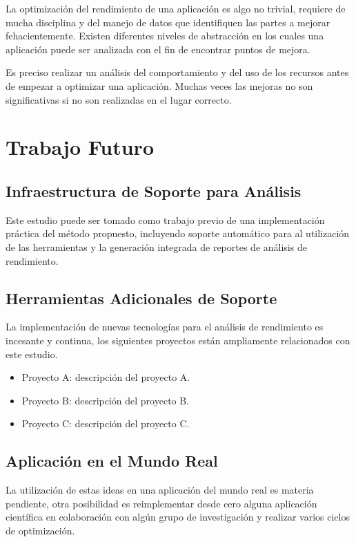 \documentclass[a4paper]{report}
\begin{document}
\bigskip

La optimización del rendimiento de una aplicación es algo no trivial, requiere de mucha
disciplina y del manejo de datos que identifiquen las partes a mejorar fehacientemente.
Existen diferentes niveles de abstracción en los cuales una aplicación puede ser analizada con el fin
de encontrar puntos de mejora. 

\bigskip

Es preciso realizar un análisis del comportamiento y del uso de los recursos antes de
empezar a optimizar una aplicación. Muchas veces las mejoras no son significativas si no
son realizadas en el lugar correcto.

\chapter{Trabajo Futuro}

\section{Infraestructura de Soporte para Análisis}

Este estudio puede ser tomado como trabajo previo de una implementación práctica del método propuesto,
incluyendo soporte automático para al utilización de las herramientas y la generación integrada de
reportes de análisis de rendimiento.

\section{Herramientas Adicionales de Soporte}

La implementación de nuevas tecnologías para el análisis de rendimiento
es incesante y continua, los siguientes proyectos están ampliamente
relacionados con este estudio.

\begin{itemize}
\item Proyecto A: descripción del proyecto A.
\item Proyecto B: descripción del proyecto B.
\item Proyecto C: descripción del proyecto C.
\end{itemize}

\section{Aplicación en el Mundo Real}

La utilización de estas ideas en una aplicación del mundo real es materia
pendiente, otra posibilidad es reimplementar desde cero alguna aplicación
científica en colaboración con algún grupo de investigación y realizar
varios ciclos de optimización.
\end{document}

